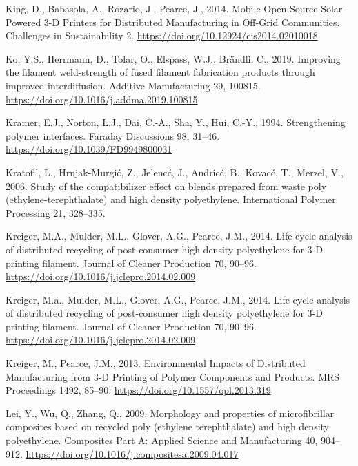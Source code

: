 \documentclass[
  12pt,
  number,
  review]{elsarticle}
\newlength{\cslhangindent}
\newlength{\cslentryspacingunit} %
\newenvironment{CSLReferences}[2] %
 {%
  \setlength{\parindent}{0pt}
  \ifodd #1
  \let\oldpar\par
  \def\par{\hangindent=\cslhangindent\oldpar}
  \fi
  \setlength{\parskip}{#2\cslentryspacingunit}
 }%
 {}
\begin{document}
\begin{CSLReferences}{1}{0}
\leavevmode{}%
King, D., Babasola, A., Rozario, J., Pearce, J., 2014. Mobile
{Open-Source Solar-Powered} 3-{D Printers} for {Distributed
Manufacturing} in {Off-Grid Communities}. Challenges in Sustainability
2. \url{https://doi.org/10.12924/cis2014.02010018}

\leavevmode{}%
Ko, Y.S., Herrmann, D., Tolar, O., Elspass, W.J., Brändli, C., 2019.
Improving the filament weld-strength of fused filament fabrication
products through improved interdiffusion. Additive Manufacturing 29,
100815. \url{https://doi.org/10.1016/j.addma.2019.100815}

\leavevmode{}%
Kramer, E.J., Norton, L.J., Dai, C.-A., Sha, Y., Hui, C.-Y., 1994.
Strengthening polymer interfaces. Faraday Discussions 98, 31--46.
\url{https://doi.org/10.1039/FD9949800031}

\leavevmode{}%
Kratofil, L., Hrnjak-Murgić, Z., Jelencć, J., Andricć, B., Kovacć, T.,
Merzel, V., 2006. Study of the compatibilizer effect on blends prepared
from waste poly (ethylene-terephthalate) and high density polyethylene.
International Polymer Processing 21, 328--335.

\leavevmode{}%
Kreiger, M.A., Mulder, M.L., Glover, A.G., Pearce, J.M., 2014. Life
cycle analysis of distributed recycling of post-consumer high density
polyethylene for 3-{D} printing filament. Journal of Cleaner Production
70, 90--96. \url{https://doi.org/10.1016/j.jclepro.2014.02.009}

\leavevmode{}%
Kreiger, M.a., Mulder, M.L., Glover, A.G., Pearce, J.M., 2014. Life
cycle analysis of distributed recycling of post-consumer high density
polyethylene for 3-{D} printing filament. Journal of Cleaner Production
70, 90--96. \url{https://doi.org/10.1016/j.jclepro.2014.02.009}

\leavevmode{}%
Kreiger, M., Pearce, J.M., 2013. Environmental {Impacts} of {Distributed
Manufacturing} from 3-{D Printing} of {Polymer Components} and
{Products}. MRS Proceedings 1492, 85--90.
\url{https://doi.org/10.1557/opl.2013.319}

\leavevmode{}%
Lei, Y., Wu, Q., Zhang, Q., 2009. Morphology and properties of
microfibrillar composites based on recycled poly (ethylene
terephthalate) and high density polyethylene. Composites Part A: Applied
Science and Manufacturing 40, 904--912.
\url{https://doi.org/10.1016/j.compositesa.2009.04.017}


\end{CSLReferences}
\end{document}
